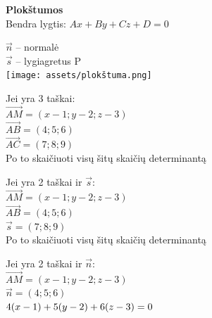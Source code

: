 \documentclass[fleqn]{article} %
\begin{document}
\begin{center} \textbf{Plokštumos} \\ Bendra lygtis: $Ax + By + Cz + D = 0$ \end{center}
\begin{multicols}{4}
    $\vec{n}$ -- normalė \\
    $\vec{s}$ -- lygiagretus P \\
    \texttt{[image: assets/plokštuma.png]}
    \vfill\null
    \columnbreak

    Jei yra 3 taškai: \\
    $\vec{AM} = (x - 1; y - 2; z - 3)$ \\
    $\vec{AB} = (  4;     5;     6  )$ \\
    $\vec{AC} = (  7;     8;     9  )$ \\ 
    Po to skaičiuoti visų šitų skaičių determinantą
    \vfill\null
    \columnbreak

    Jei yra 2 taškai ir $\vec{s}$: \\
    $\vec{AM} = (x - 1; y - 2; z - 3)$ \\
    $\vec{AB} = (  4;     5;     6  )$ \\
    $\vec{s}  = (  7;     8;     9  )$ \\ 
    Po to skaičiuoti visų šitų skaičių determinantą
    \vfill\null
    \columnbreak

    Jei yra 2 taškai ir $\vec{n}$: \\
    $\vec{AM} = (x - 1; y - 2; z - 3)$ \\
    $\vec{n}  = (  4;     5;     6  )$ \\
    $4(x - 1) + 5(y - 2) + 6(z - 3)\nobreak=\nobreak 0$
\end{multicols}
\end{document}
